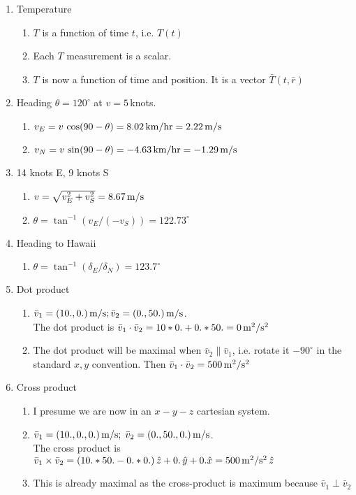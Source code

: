 \documentclass[11pt,letterpaper]{article}
\begin{document}
\begin{enumerate}
\begin{enumerate}
  \item Temperature
  \begin{enumerate}
    \item $T$ is a function of time $t$, i.e. $T(t)$
    \item Each $T$ measurement is a scalar.  
    \item $T$ is now a function of time and position.  It is a vector $\bar T(t, \bar r)$
  \end{enumerate}

  \item Heading $\theta = 120^\circ$ at $v = 5$\,knots.
  \begin{enumerate}
    \item $v_E = v \, \cos(90-\theta) = 8.02 \, \rm km/hr = 2.22 \, \rm m/s$
    \item $v_N = v \, \sin(90-\theta) = -4.63 \, \rm km/hr = -1.29 \, \rm m/s$
  \end{enumerate}

  \item 14 knots E, 9 knots S
  \begin{enumerate}
    \item $v = \sqrt{v_E^2 + v_S^2} = 8.67 \, \rm m/s$
    \item $\theta = \tan^{-1}(v_E/(-v_S)) = 122.73^\circ$
  \end{enumerate}

  \item Heading to Hawaii
  \begin{enumerate}
    \item $\theta = \tan^{-1}(\delta_E/\delta_N) = 123.7^\circ$
  \end{enumerate}

  \item Dot product
  \begin{enumerate}
    \item $\bar v_1 = (10., 0.) \, {\rm m/s}; \bar v_2 = (0., 50.) \, {\rm m/s}$.  \\
    The dot product is $\bar v_1 \cdot \bar v_2 = 10*0. + 0.*50. = 0 \, \rm m^2/s^2$
    \item The dot product will be maximal when $\bar v_2 \parallel \bar v_1$, i.e. rotate it $-90^\circ$
    in the standard $x,y$ convention.  Then $\bar v_1 \cdot \bar v_2 = 500 \, \rm m^2/s^2$
  \end{enumerate}

  \item Cross product
  \begin{enumerate}
    \item I presume we are now in an $x-y-z$ cartesian system.
    \item $\bar v_1 = (10., 0., 0.) \, {\rm m/s}; \; \bar v_2 = (0., 50., 0.) \, {\rm m/s}$.  \\
    The cross product is $\bar v_1 \times \bar v_2 = (10.*50. - 0.*0.) \, \hat z + 0. \, \hat y 
    + 0. \hat x = 500 \, {\rm m^2/s^2} \, \hat z$ 
    \item This is already maximal as the cross-product is maximum because $\bar v_1 \perp \bar v_2$
  \end{enumerate}


\end{enumerate}
\end{enumerate}
\end{document}
